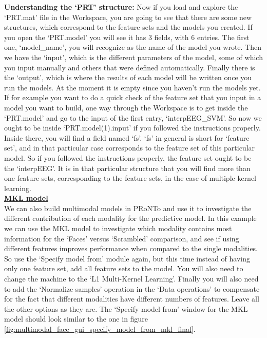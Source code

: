 \noindent \textbf{Understanding the `PRT' structure:} Now if you load and explore the `PRT.mat' file in the \matlab{} Workspace, you are going to see that there are some new structures, which correspond to the feature sets and the models you created. If you open the `PRT.model' you will see it has 3 fields, with 6 entries. The first one, `model\_name', you will recognize as the name of the model you wrote. Then we have the `input', which is the different parameters of the model, some of which you input manually and others that were defined automatically. Finally there is the `output', which is where the results of each model will be written once you run the models. At the moment it is empty since you haven't run the models yet.
\\

If for example you want to do a quick check of the feature set that you input in a model you want to build, one way through the \matlab{} Workspace is to get inside the `PRT.model' and go to the input of the first entry, `interpEEG\_SVM'. So now we ought to be inside `PRT.model(1).input' if you followed the instructions properly. Inside there, you will find a field named `fs'. `fs' in general is short for `feature set', and in that particular case corresponds to the feature set of this particular model. So if you followed the instructions properly, the feature set ought to be the `interpEEG'. It is in that particular structure that you will find more than one feature sets, corresponding to the feature sets, in the case of multiple kernel learning.
\\

\noindent \textbf{\underline{MKL model}}
\\

We can also build multimodal models in PRoNTo and use it to investigate the different contribution of each modality for the predictive model. In this example we can use the MKL model to investigate which modality contains most information for the `Faces' versus `Scrambled' comparison, and see if using different features improves performance when compared to the single modalities. So use the `Specify model from' module again, but this time instead of having only one feature set, add all feature sets to the model. You will also need to change the machine to the `L1 Multi-Kernel Learning'. Finally you will also need to add the `Normalize samples' operation in the `Data operations' to compensate for the fact that different modalities have different numbers of features. Leave all the other options as they are. The `Specify model from' window for the MKL model should look similar to the one in figure \ref{fig:multimodal_face_gui_specify_model_from_mkl_final}.

